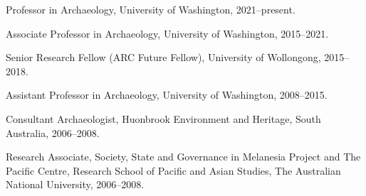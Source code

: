 
\ind Professor in Archaeology,  University of Washington, 2021--present.

\ind Associate Professor in Archaeology,  University of Washington, 2015--2021.

\ind Senior Research Fellow (ARC Future Fellow),  University of Wollongong, 2015--2018.    

\ind Assistant Professor in Archaeology,  University of Washington, 2008--2015.     

\ind Consultant Archaeologist, Huonbrook Environment and Heritage, South Australia, 2006--2008.

\ind Research Associate, Society, State and Governance in Melanesia Project and The Pacific Centre, Research School of Pacific and Asian Studies, The Australian National University, 2006--2008.
